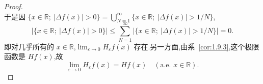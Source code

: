 \begin{proof}
\begin{equation*}
\end{equation*}
于是因 $\{x \in \mathbb{R};\ |\Delta f(x)| > 0\} = \bigcup_{N=1}^{\infty}\{x \in \mathbb{R};\ |\Delta f(x)| > 1/N\}$,
\begin{equation*}
|\{x \in \mathbb{R};\ |\Delta f(x)| > 0\}| \leq \sum_{N=1}^{\infty}\left|\{x \in \mathbb{R};\ |\Delta f(x)| > 1/N\}\right| = 0.
\end{equation*}
即对几乎所有的 $x \in \mathbb{R}$,$\lim_{\varepsilon \to 0}H_{\varepsilon}f(x)$ 存在.另一方面,由系~\ref{cor:1.9.3},这个极限函数是 $Hf(x)$,故
\begin{equation*}
\lim_{\varepsilon \to 0}H_{\varepsilon}f(x) = Hf(x) \quad (\text{a.e. } x \in \mathbb{R}).
\end{equation*}
\end{proof}
